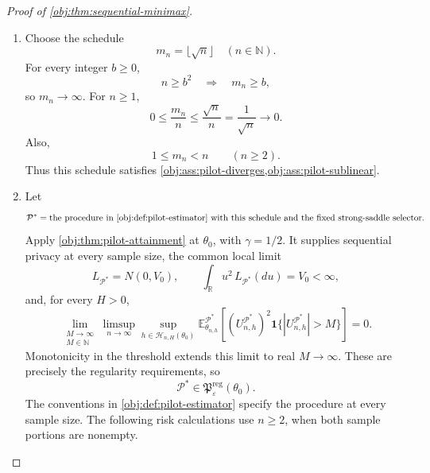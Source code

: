 \begin{proof}[Proof of \cref{obj:thm:sequential-minimax}]
\begin{enumerate}
\item
Choose the schedule
\[
m_n=\lfloor\sqrt n\rfloor\quad(n\in\mathbb N).
\]
For every integer \(b\ge0\),
\[
n\ge b^2\quad\Longrightarrow\quad m_n\ge b,
\]
so \(m_n\to\infty\). For \(n\ge1\),
\[
0\le\frac{m_n}{n}
\le\frac{\sqrt n}{n}
=\frac1{\sqrt n}\longrightarrow0.
\]
Also,
\[
1\le m_n<n\qquad(n\ge2).
\]
Thus this schedule satisfies
\cref{obj:ass:pilot-diverges,obj:ass:pilot-sublinear}.

\item
Let
\[
\mathcal P^*
=
\text{the procedure in \cref{obj:def:pilot-estimator}
with this schedule and the fixed strong-saddle selector}.
\]
Apply \cref{obj:thm:pilot-attainment} at \(\theta_0\), with \(\gamma=1/2\). It supplies sequential privacy at every sample size, the common local limit
\[
L_{\mathcal P^*}=N(0,V_0),
\qquad
\int_{\mathbb R}u^2\,L_{\mathcal P^*}(du)=V_0<\infty,
\]
and, for every \(H>0\),
\[
\lim_{\substack{M\to\infty\\M\in\mathbb N}}
\limsup_{n\to\infty}
\sup_{h\in\mathcal H_{n,H}(\theta_0)}
\mathbb E_{\theta_{n,h}}^{\mathcal P^*}
\!\left[
(U_{n,h}^{\mathcal P^*})^2
\mathbf1\{|U_{n,h}^{\mathcal P^*}|>M\}
\right]
=0.
\]
Monotonicity in the threshold extends this limit to real \(M\to\infty\). These are precisely the regularity requirements, so
\[
\mathcal P^*\in\mathfrak P^{\mathrm{reg}}_\varepsilon(\theta_0).
\]
The conventions in \cref{obj:def:pilot-estimator} specify the procedure at every sample size. The following risk calculations use \(n\ge2\), when both sample portions are nonempty.


\end{enumerate}
\end{proof}
